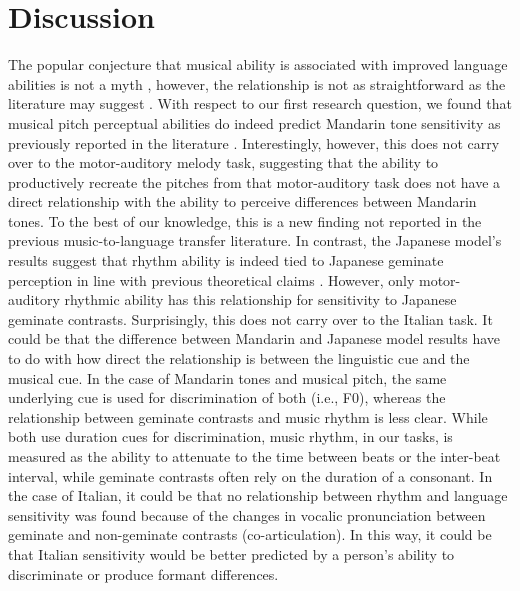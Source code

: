 \documentclass[a4paper]{article}
\begin{document}
\section{Discussion}

The popular conjecture that musical ability is associated with improved language abilities is not a myth \cite{Slevc_Miyake_2006b}, however, the relationship is not as straightforward as the literature may suggest \cite{neves_et_al_2022_music}. With respect to our first research question, we found that musical pitch perceptual abilities do indeed predict Mandarin tone sensitivity as previously reported in the literature \cite{zheng_et_al_2018_pitch}. Interestingly, however, this does not carry over to the motor-auditory melody task, suggesting that the ability to productively recreate the pitches from that motor-auditory task does not have a direct relationship with the ability to perceive differences between Mandarin tones. To the best of our knowledge, this is a new finding not reported in the previous music-to-language transfer literature. In contrast, the Japanese model's results suggest that rhythm ability is indeed tied to Japanese geminate perception in line with previous theoretical claims \cite{lofqvist_2017_effect}. However, only motor-auditory rhythmic ability has this relationship for sensitivity to Japanese geminate contrasts. Surprisingly, this does not carry over to the Italian task. It could be that the difference between Mandarin and Japanese model results have to do with how direct the relationship is between the linguistic cue and the musical cue. In the case of Mandarin tones and musical pitch, the same underlying cue is used for discrimination of both (i.e., F0), whereas the relationship between geminate contrasts and music rhythm is less clear. While both use duration cues for discrimination, music rhythm, in our tasks, is measured as the ability to attenuate to the time between beats or the inter-beat interval, while geminate contrasts often rely on the duration of a consonant. In the case of Italian, it could be that no relationship between rhythm and language sensitivity was found because of the changes in vocalic pronunciation between geminate and non-geminate contrasts (co-articulation). In this way, it could be that Italian sensitivity would be better predicted by a person's ability to discriminate or produce formant differences. 
\end{document}
